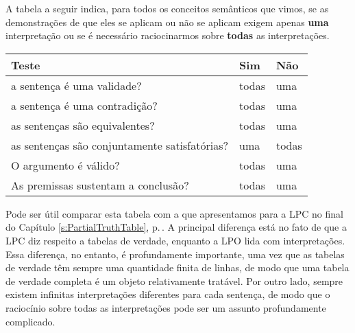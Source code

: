 A tabela a seguir indica, para todos os conceitos semânticos que vimos, se as demonstrações de que eles se aplicam ou não se aplicam exigem apenas \textbf{uma} interpretação ou se é necessário raciocinarmos sobre \textbf{todas} as interpretações.

\begin{center} %
\begin{tabular}{l l l}
\cline{1-3}
\textbf{Teste} & \textbf{Sim} & \textbf{Não}\\
 \hline
\cline{1-3}
a sentença é uma validade? & todas & uma \\
a sentença é uma contradição? &  todas  & uma \\
as sentenças são equivalentes? & todas & uma \\
as sentenças são conjuntamente satisfatórias? & uma & todas \\
O argumento é válido? & todas & uma \\
As premissas sustentam a conclusão? & todas & uma \\
\cline{1-3}
\end{tabular}
\end{center}
\label{table.ModelOrArgument}




Pode ser útil comparar esta tabela com a que apresentamos para a LPC no final do Capítulo \ref{s:PartialTruthTable}, p.\,\pageref{t:TruthTable}.
A principal diferença está no fato de que a LPC diz respeito a tabelas de verdade, enquanto a LPO lida com interpretações.
Essa diferença, no entanto, é profundamente importante, uma vez que as tabelas de verdade têm sempre uma quantidade finita de linhas, de modo que uma tabela de verdade completa é um objeto relativamente tratável.
Por outro lado, sempre existem infinitas interpretações diferentes para cada sentença, de modo que o raciocínio sobre todas as interpretações pode ser um assunto profundamente complicado.
